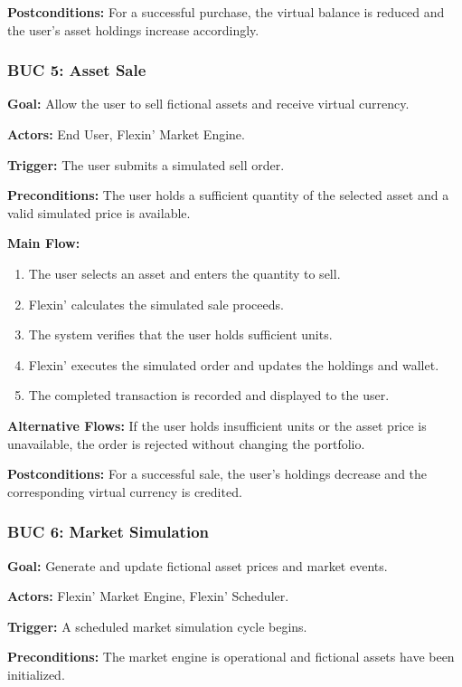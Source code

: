 \documentclass[12pt]{article}
\begin{document}
\textbf{Postconditions:} For a successful purchase, the virtual balance is
reduced and the user's asset holdings increase accordingly.

\subsubsection*{BUC 5: Asset Sale}

\textbf{Goal:} Allow the user to sell fictional assets and receive virtual
currency.

\textbf{Actors:} End User, Flexin' Market Engine.

\textbf{Trigger:} The user submits a simulated sell order.

\textbf{Preconditions:} The user holds a sufficient quantity of the selected
asset and a valid simulated price is available.

\textbf{Main Flow:}
\begin{enumerate}
    \item The user selects an asset and enters the quantity to sell.
    \item Flexin' calculates the simulated sale proceeds.
    \item The system verifies that the user holds sufficient units.
    \item Flexin' executes the simulated order and updates the holdings and wallet.
    \item The completed transaction is recorded and displayed to the user.
\end{enumerate}

\textbf{Alternative Flows:} If the user holds insufficient units or the
asset price is unavailable, the order is rejected without changing the
portfolio.

\textbf{Postconditions:} For a successful sale, the user's holdings decrease
and the corresponding virtual currency is credited.

\subsubsection*{BUC 6: Market Simulation}

\textbf{Goal:} Generate and update fictional asset prices and market events.

\textbf{Actors:} Flexin' Market Engine, Flexin' Scheduler.

\textbf{Trigger:} A scheduled market simulation cycle begins.

\textbf{Preconditions:} The market engine is operational and fictional assets
have been initialized.
\end{document}
